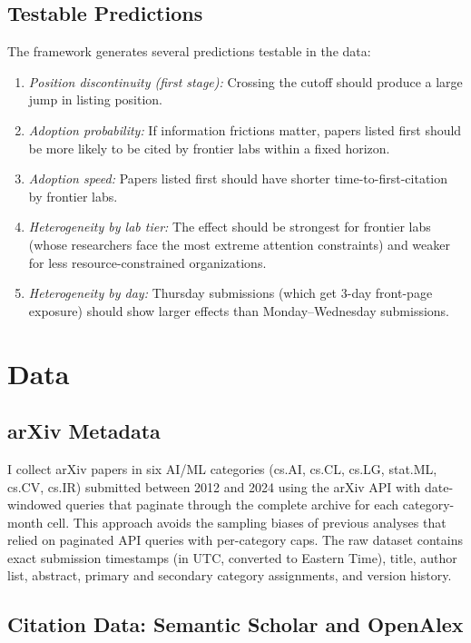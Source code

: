 \documentclass[12pt]{article}
\begin{document}
\subsection{Testable Predictions}

The framework generates several predictions testable in the data:

\begin{enumerate}
    \item \textit{Position discontinuity (first stage):} Crossing the cutoff should produce a large jump in listing position.
    \item \textit{Adoption probability:} If information frictions matter, papers listed first should be more likely to be cited by frontier labs within a fixed horizon.
    \item \textit{Adoption speed:} Papers listed first should have shorter time-to-first-citation by frontier labs.
    \item \textit{Heterogeneity by lab tier:} The effect should be strongest for frontier labs (whose researchers face the most extreme attention constraints) and weaker for less resource-constrained organizations.
    \item \textit{Heterogeneity by day:} Thursday submissions (which get 3-day front-page exposure) should show larger effects than Monday--Wednesday submissions.
\end{enumerate}


\section{Data}

\subsection{arXiv Metadata}

I collect arXiv papers in six AI/ML categories (cs.AI, cs.CL, cs.LG, stat.ML, cs.CV, cs.IR) submitted between 2012 and 2024 using the arXiv API with date-windowed queries that paginate through the complete archive for each category-month cell. This approach avoids the sampling biases of previous analyses that relied on paginated API queries with per-category caps. The raw dataset contains exact submission timestamps (in UTC, converted to Eastern Time), title, author list, abstract, primary and secondary category assignments, and version history.

\subsection{Citation Data: Semantic Scholar and OpenAlex}
\end{document}
